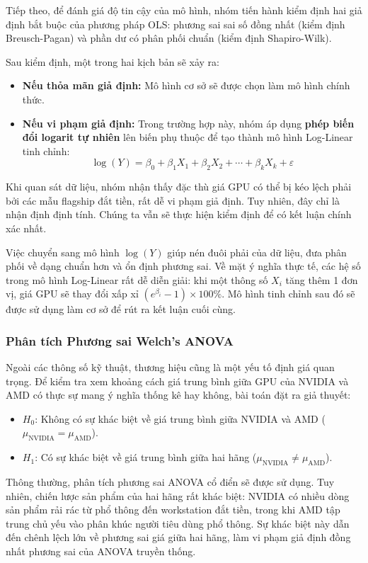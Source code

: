 \documentclass[a4paper]{article}
\begin{document}
Tiếp theo, để đánh giá độ tin cậy của mô hình, nhóm tiến hành kiểm định hai giả định bắt buộc của phương pháp OLS: phương sai sai số đồng nhất (kiểm định Breusch-Pagan) và phần dư có phân phối chuẩn (kiểm định Shapiro-Wilk). 

Sau kiểm định, một trong hai kịch bản sẽ xảy ra:
\begin{itemize}
    \item \textbf{Nếu thỏa mãn giả định:} Mô hình cơ sở sẽ được chọn làm mô hình chính thức.
    \item \textbf{Nếu vi phạm giả định:} Trong trường hợp này, nhóm áp dụng \textbf{phép biến đổi logarit tự nhiên} lên biến phụ thuộc để tạo thành mô hình Log-Linear tinh chỉnh:
\[
  \log(Y) = \beta_0 + \beta_1 X_1 + \beta_2 X_2 + \cdots + \beta_k X_k + \varepsilon
\]
\end{itemize}

Khi quan sát dữ liệu, nhóm nhận thấy đặc thù giá GPU có thể bị kéo lệch phải bởi các mẫu flagship đắt tiền, rất dễ vi phạm giả định. Tuy nhiên, đây chỉ là nhận định định tính. Chúng ta vẫn sẽ thực hiện kiểm định để có kết luận chính xác nhất.

Việc chuyển sang mô hình $\log(Y)$ giúp nén đuôi phải của dữ liệu, đưa phân phối về dạng chuẩn hơn và ổn định phương sai. Về mặt ý nghĩa thực tế, các hệ số trong mô hình Log-Linear rất dễ diễn giải: khi một thông số $X_i$ tăng thêm 1 đơn vị, giá GPU sẽ thay đổi xấp xỉ $(e^{\beta_i} - 1) \times 100\%$. Mô hình tinh chỉnh sau đó sẽ được sử dụng làm cơ sở để rút ra kết luận cuối cùng.

\subsubsection{Phân tích Phương sai Welch's ANOVA}

Ngoài các thông số kỹ thuật, thương hiệu cũng là một yếu tố định giá quan trọng. Để kiểm tra xem khoảng cách giá trung bình giữa GPU của NVIDIA và AMD có thực sự mang ý nghĩa thống kê hay không, bài toán đặt ra giả thuyết:
\begin{itemize}
    \item $H_0$: Không có sự khác biệt về giá trung bình giữa NVIDIA và AMD ($\mu_{\mathrm{NVIDIA}} = \mu_{\mathrm{AMD}}$).
    \item $H_1$: Có sự khác biệt về giá trung bình giữa hai hãng ($\mu_{\mathrm{NVIDIA}} \neq \mu_{\mathrm{AMD}}$).
\end{itemize}

Thông thường, phân tích phương sai ANOVA cổ điển sẽ được sử dụng. Tuy nhiên, chiến lược sản phẩm của hai hãng rất khác biệt: NVIDIA có nhiều dòng sản phẩm rải rác từ phổ thông đến workstation đắt tiền, trong khi AMD tập trung chủ yếu vào phân khúc người tiêu dùng phổ thông. Sự khác biệt này dẫn đến chênh lệch lớn về phương sai giá giữa hai hãng, làm vi phạm giả định đồng nhất phương sai của ANOVA truyền thống.
\end{document}
